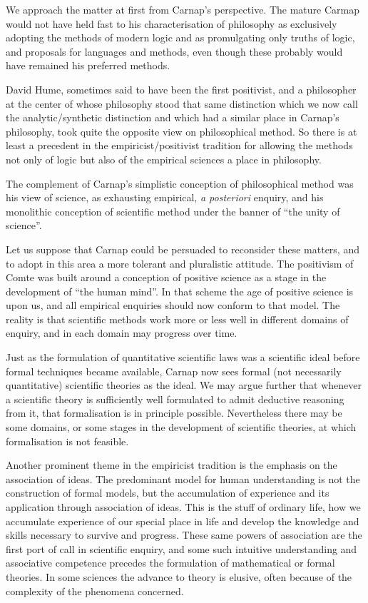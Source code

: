 \documentclass[10pt,titlepage]{book}
\begin{document}
We approach the matter at first from Carnap's perspective.
The mature Carmap would not have held fast to his characterisation of
philosophy as exclusively adopting the methods of modern logic and as
promulgating only truths of logic, and proposals for languages and
methods, even though these probably would have remained his preferred
methods.

David Hume, sometimes said to have been the first positivist, and a
philosopher at the center of whose philosophy stood that same
distinction which we now call the analytic/synthetic distinction and
which had a similar place in Carnap's philosophy, took quite the
opposite view on philosophical method.
So there is at least a precedent in the empiricist/positivist
tradition for allowing the methods not only of logic but also of the
empirical sciences a place in philosophy.

The complement of Carnap's simplistic conception of philosophical
method was his view of science, as exhausting empirical, \emph{a
  posteriori} enquiry, and his monolithic conception of scientific
method under the banner of ``the unity of science''.

Let us suppose that Carnap could be persuaded to reconsider these
matters, and to adopt in this area a more tolerant and pluralistic
attitude.
The positivism of Comte was built around a conception of positive
science as a stage in the development of ``the human mind''.
In that scheme the age of positive science is upon us, and all
empirical enquiries should now conform to that model.
The reality is that scientific methods work more or less well in
different domains of enquiry, and in each domain may progress over
time.

Just as the formulation of quantitative scientific laws was a
scientific ideal before formal techniques became available, Carnap now
sees formal (not necessarily quantitative) scientific theories as the
ideal.
We may argue further that whenever a scientific theory is sufficiently
well formulated to admit deductive reasoning from it, that
formalisation is in principle possible.
Nevertheless there may be some domains, or some stages in the
development of scientific theories, at which formalisation is not
feasible.

Another prominent theme in the empiricist tradition is the emphasis on
the association of ideas.
The predominant model for human understanding is not the construction
of formal models, but the accumulation of experience and its
application through association of ideas.
This is the stuff of ordinary life, how we accumulate experience of
our special place in life and develop the knowledge and skills
necessary to survive and progress.
These same powers of association are the first port of call in
scientific enquiry, and some such intuitive understanding and
associative competence precedes the formulation of mathematical or
formal theories.
In some sciences the advance to theory is elusive, often because of
the complexity of the phenomena concerned.
\end{document}
